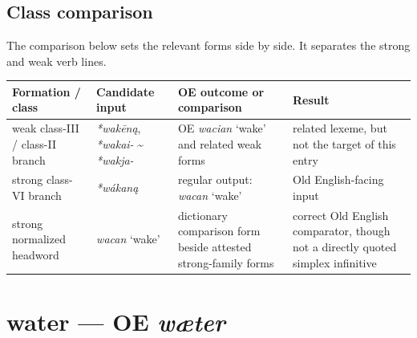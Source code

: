 \documentclass[
  british,
  a4paper,
  openany]{book}
\newcounter{none} %
\providecommand{\texorpdfstring}[2]{#1}
\begin{document}
\subsection{Class comparison}\label{class-comparison-4}

The comparison below sets the relevant forms side by side. It separates
the strong and weak verb lines.

{\def\LTcaptype{none} %
\begin{longtable}[]{@{}
  >{\raggedright\arraybackslash}p{}
  >{\raggedright\arraybackslash}p{}
  >{\raggedright\arraybackslash}p{}
  >{\raggedright\arraybackslash}p{}@{}}
\toprule\noalign{}
\begin{minipage}[b]{\linewidth}\raggedright
Formation / class
\end{minipage} & \begin{minipage}[b]{\linewidth}\raggedright
Candidate input
\end{minipage} & \begin{minipage}[b]{\linewidth}\raggedright
OE outcome or comparison
\end{minipage} & \begin{minipage}[b]{\linewidth}\raggedright
Result
\end{minipage} \\
\midrule\noalign{}
\endhead
\bottomrule\noalign{}
\endlastfoot
weak class-III / class-II branch & {\emph{*wakēną}}, \emph{*wakai-}
\textasciitilde{} \emph{*wakja-} & OE {\emph{wacian}} `wake' and related
weak forms & related lexeme, but not the target of this entry \\
strong class-VI branch & {\emph{*wákaną}} & regular output:
{\emph{wacan}} `wake' & Old English-facing input \\
strong normalized headword & {\emph{wacan}} `wake' & dictionary
comparison form beside attested strong-family forms & correct Old
English comparator, though not a directly quoted simplex infinitive \\
\end{longtable}
}

\section{\texorpdfstring{water --- OE
\emph{wæter}}{water --- OE wæter}}\label{water-oe-wuxe6ter}
\end{document}

